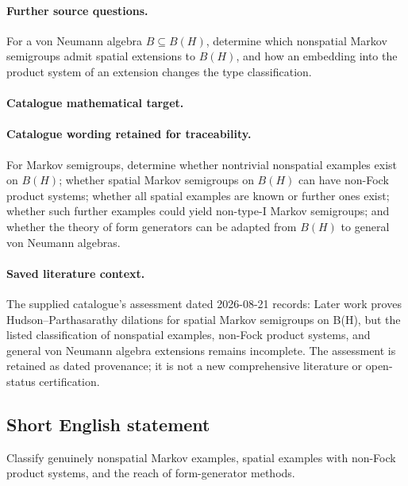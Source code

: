 \documentclass[11pt]{article}
\begin{document}
\paragraph{Further source questions.} For a von Neumann algebra $B\subseteq B(H)$, determine which nonspatial Markov semigroups admit spatial extensions to $B(H)$, and how an embedding into the product system of an extension changes the type classification.

\paragraph{Catalogue mathematical target.}
\paragraph{Catalogue wording retained for traceability.}
For Markov semigroups, determine whether nontrivial nonspatial examples exist on $B(H)$; whether spatial Markov semigroups on $B(H)$ can have non-Fock product systems; whether all spatial examples are known or further ones exist; whether such further examples could yield non-type-I Markov semigroups; and whether the theory of form generators can be adapted from $B(H)$ to general von Neumann algebras.

\paragraph{Saved literature context.} The supplied catalogue's assessment dated 2026-08-21 records: Later work proves Hudson--Parthasarathy dilations for spatial Markov semigroups on B(H), but the listed classification of nonspatial examples, non-Fock product systems, and general von Neumann algebra extensions remains incomplete. The assessment is retained as dated provenance; it is not a new comprehensive literature or open-status certification.
\subsection{Short English statement}
Classify genuinely nonspatial Markov examples, spatial examples with non-Fock product systems, and the reach of form-generator methods.
\end{document}
